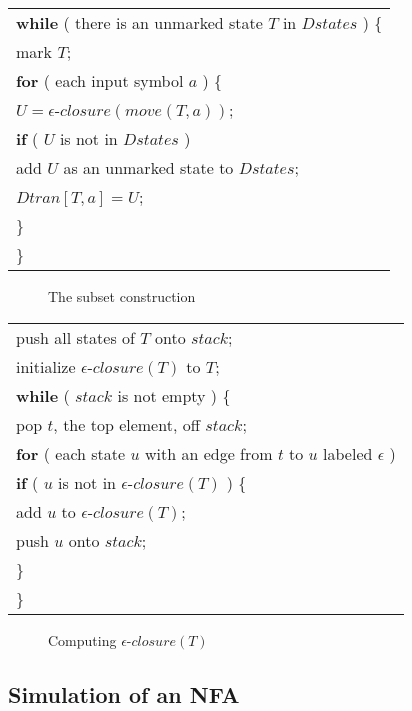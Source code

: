 \documentclass[a4paper,twoside]{book}
\begin{document}
\begin{center}
    \begin{tabular}{l}
        \textbf{while} ( there is an unmarked state $T$ in $Dstates$ ) \{\\
        \qquad mark $T$;\\
        \qquad\textbf{for} ( each input symbol $a$ ) \{\\
        \qquad\qquad$U=\epsilon$-$closure(move(T,a))$;\\
        \qquad\qquad\textbf{if} ( $U$ is not in $Dstates$ )\\
        \qquad\qquad\qquad add $U$ as an unmarked state to $Dstates$;\\
        \qquad\qquad$Dtran[T,a]=U$;\\
        \qquad\}\\
        \}
    \end{tabular}
\end{center}
\begin{figure}[htbp]
    \caption{The subset construction}
    \label{Figure:3.32}
\end{figure}

\begin{center}
    \begin{tabular}{l}
        push all states of $T$ onto $stack$;\\
        initialize $\epsilon$-$closure(T)$ to $T$;\\
        \textbf{while} ( $stack$ is not empty ) \{\\
        \qquad pop $t$, the top element, off $stack$;\\
        \qquad\textbf{for} ( each state $u$ with an edge from $t$ to $u$ labeled $\epsilon$ )\\
        \qquad\qquad\textbf{if} ( $u$ is not in $\epsilon$-$closure(T)$ ) \{\\
        \qquad\qquad\qquad add $u$ to $\epsilon$-$closure(T)$;\\
        \qquad\qquad\qquad push $u$ onto $stack$;\\
        \qquad\qquad\}\\
        \}
    \end{tabular}
\end{center}
\begin{figure}[htbp]
    \caption{Computing $\epsilon$-$closure(T)$}
    \label{Figure:3.33}
\end{figure}

\subsection{Simulation of an NFA}
\end{document}
